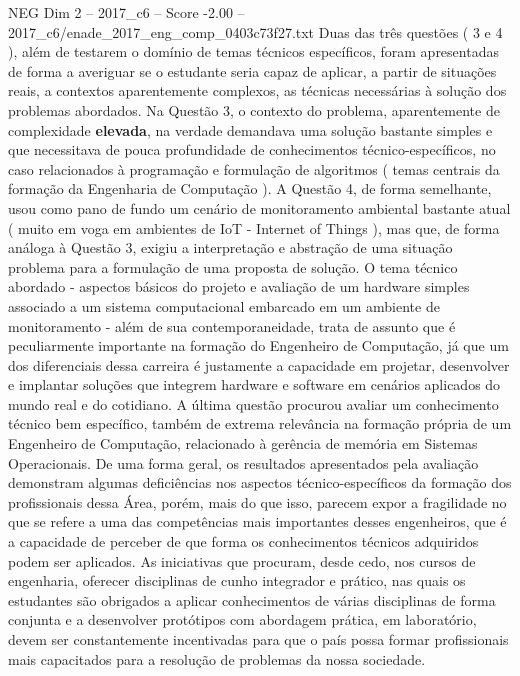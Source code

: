 \begin{textsample}{NEG Dim 2 – 2017\_c6 – Score -2.00 – 2017\_c6/enade\_2017\_eng\_comp\_0403c73f27.txt}
Duas das três questões ( 3 e 4 ), além de testarem o domínio de temas técnicos específicos, foram apresentadas de forma a averiguar se o estudante seria capaz de aplicar, a partir de situações reais, a contextos aparentemente complexos, as técnicas necessárias à solução dos problemas abordados.
Na Questão 3, o contexto do problema, aparentemente de complexidade \textbf{elevada}, na verdade demandava uma solução bastante simples e que necessitava de pouca profundidade de conhecimentos técnico-específicos, no caso relacionados à programação e formulação de algoritmos ( temas centrais da formação da Engenharia de Computação ).
A Questão 4, de forma semelhante, usou como pano de fundo um cenário de monitoramento ambiental bastante atual ( muito em voga em ambientes de IoT - Internet of Things ), mas que, de forma análoga à Questão 3, exigiu a interpretação e abstração de uma situação problema para a formulação de uma proposta de solução.
O tema técnico abordado - aspectos básicos do projeto e avaliação de um hardware simples associado a um sistema computacional embarcado em um ambiente de monitoramento - além de sua contemporaneidade, trata de assunto que é peculiarmente importante na formação do Engenheiro de Computação, já que um dos diferenciais dessa carreira é justamente a capacidade em projetar, desenvolver e implantar soluções que integrem hardware e software em cenários aplicados do mundo real e do cotidiano.
A última questão procurou avaliar um conhecimento técnico bem específico, também de extrema relevância na formação própria de um Engenheiro de Computação, relacionado à gerência de memória em Sistemas Operacionais.
De uma forma geral, os resultados apresentados pela avaliação demonstram algumas deficiências nos aspectos técnico-específicos da formação dos profissionais dessa Área, porém, mais do que isso, parecem expor a fragilidade no que se refere a uma das competências mais importantes desses engenheiros, que é a capacidade de perceber de que forma os conhecimentos técnicos adquiridos podem ser aplicados.
As iniciativas que procuram, desde cedo, nos cursos de engenharia, oferecer disciplinas de cunho integrador e prático, nas quais os estudantes são obrigados a aplicar conhecimentos de várias disciplinas de forma conjunta e a desenvolver protótipos com abordagem prática, em laboratório, devem ser constantemente incentivadas para que o país possa formar profissionais mais capacitados para a resolução de problemas da nossa sociedade.

\end{textsample}
